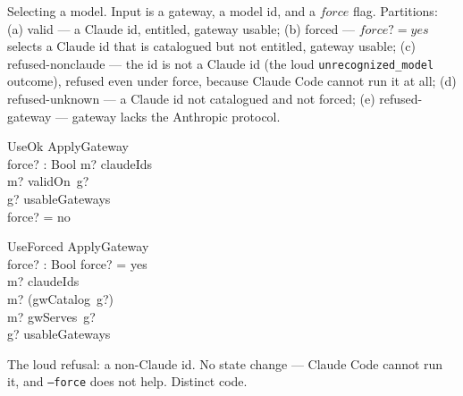 \documentclass{article}
\begin{document}
Selecting a model. Input is a gateway, a model id, and a $force$ flag.
Partitions: (a) valid --- a Claude id, entitled, gateway usable; (b) forced ---
$force? = yes$ selects a Claude id that is catalogued but not entitled, gateway
usable; (c) refused-nonclaude --- the id is not a Claude id (the loud
\texttt{unrecognized\_model} outcome), refused even under force, because Claude
Code cannot run it at all; (d) refused-unknown --- a Claude id not catalogued and
not forced; (e) refused-gateway --- gateway lacks the Anthropic protocol.

\begin{schema}{UseOk}
  ApplyGateway \\
  force? : Bool
\where
  m? \in claudeIds \\
  m? \in validOn~g? \\
  g? \in usableGateways \\
  force? = no
\end{schema}

\begin{schema}{UseForced}
  ApplyGateway \\
  force? : Bool
\where
  force? = yes \\
  m? \in claudeIds \\
  m? \in \dom (gwCatalog~g?) \\
  m? \notin gwServes~g? \\
  g? \in usableGateways
\end{schema}

The loud refusal: a non-Claude id. No state change --- Claude Code cannot run it,
and \texttt{--force} does not help. Distinct code.


\end{document}

